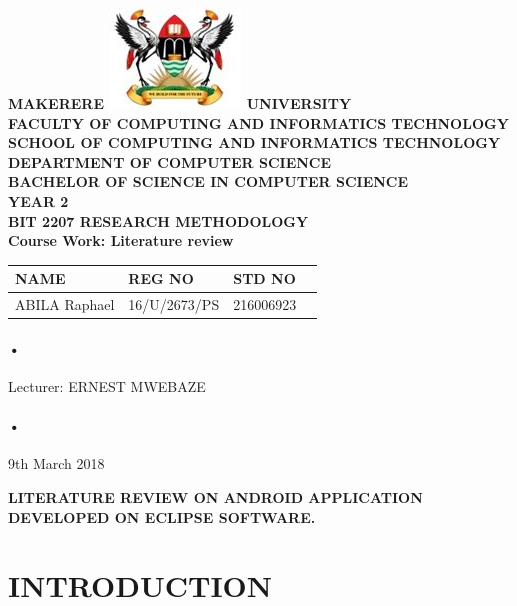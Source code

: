 \documentclass[12pt]{article}
\begin{document}
\begin{Huge}
\begin{center}
\begin{normalsize}
\textbf{MAKERERE \includegraphics[scale=0.5]{logo} UNIVERSITY }\\


\textbf{FACULTY OF COMPUTING AND INFORMATICS TECHNOLOGY} \\
\textbf{SCHOOL OF COMPUTING AND INFORMATICS TECHNOLOGY} \\
\textbf{DEPARTMENT OF COMPUTER SCIENCE} \\
\textbf{BACHELOR OF SCIENCE IN COMPUTER SCIENCE} \\
\textbf{YEAR 2} \\
\textbf{BIT 2207 RESEARCH METHODOLOGY} \\
\textbf{Course Work: Literature review}\\
\end{normalsize}
\end{center}
\end{Huge}

\begin{center}
\begin{tabular}{|l|l|l|c|}
\hline NAME  & REG NO & STD NO \\\hline

ABILA Raphael& 16/U/2673/PS & 216006923 \\\hline

\end{tabular}
\paragraph{•}
Lecturer: ERNEST MWEBAZE \\
\paragraph{•}
9th March 2018

\end{center}

\newpage
\title{}\textbf{LITERATURE REVIEW ON ANDROID APPLICATION DEVELOPED ON ECLIPSE SOFTWARE.} 


\section{INTRODUCTION}
\end{document}
